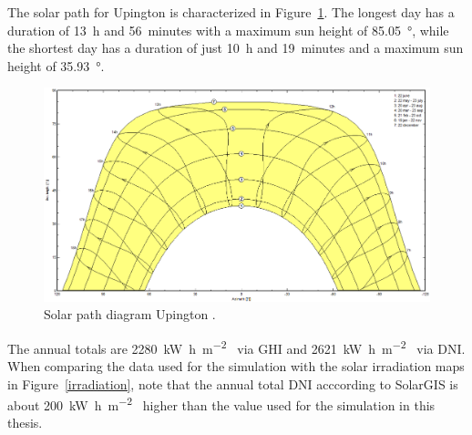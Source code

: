 The solar path for Upington is characterized in Figure~\ref{SunPathUpington}. The longest day has a duration of \SI{13}{h} and \SI{56}{minutes} with a maximum sun height of \SI{85.05}{\degree}, while the shortest day has a duration of just \SI{10}{h} and \SI{19}{minutes} and a maximum sun height of \SI{35.93}{\degree}.

\begin{figure}[htbp]  
\centering
\includegraphics[width=1\linewidth]{FIG/SunPathUpington}
\caption[Solar path diagram for Upington.]{Solar path diagram Upington \cite{PVsystSA2015}.}\label{SunPathUpington}
\end{figure}
\pagebreak

The annual totals are \SI{2280}{\kilo\watt\hour\per\square\metre\year} via GHI and \SI{2621}{\kilo\watt\hour\per\square\metre\year} via DNI. When comparing the data used for the simulation with the solar irradiation maps in Figure~\ref{irradiation}, note that the annual total DNI acccording to SolarGIS \cite{SolarGIS2015b} is about \SI{200}{\kilo\watt\hour\per\square\metre\year} higher than the value used for the simulation in this thesis.

